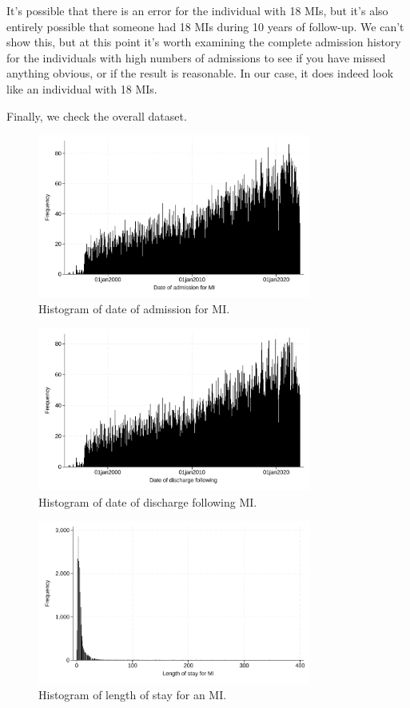 \documentclass[11pt]{article}
\begin{document}
It's possible that there is an error for the individual with 18 MIs,
but it's also entirely possible that someone had 18 MIs during 10 years 
of follow-up. We can't show this, but at this point it's worth examining 
the complete admission history for the individuals with high numbers
of admissions to see if you have missed anything obvious, or if the result
is reasonable. In our case, it does indeed look like an individual with 18 MIs. 

Finally, we check the overall dataset.

\color{Blue4}
\begin{figure}[h!]
    \centering
    \caption{Histogram of date of admission for MI.}
    \label{epistMIhist1}
    \includegraphics[width=0.8\textwidth]{HA_log/23.pdf}
\end{figure}
\begin{figure}[h!]
    \centering
    \caption{Histogram of date of discharge following MI.}
    \label{epienMIhist1}
    \includegraphics[width=0.8\textwidth]{HA_log/23_1.pdf}
\end{figure}
\begin{figure}[h!]
    \centering
    \caption{Histogram of length of stay for an MI.}
    \label{LOSMIhist1}
    \includegraphics[width=0.8\textwidth]{HA_log/23_2.pdf}
\end{figure}
\end{document}

